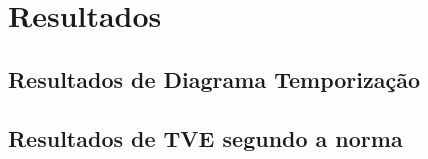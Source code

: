 \chapter{Resultados}\label{cap:quatro}  

\section{Resultados de Diagrama Temporização}

\section{Resultados de TVE segundo a norma}
